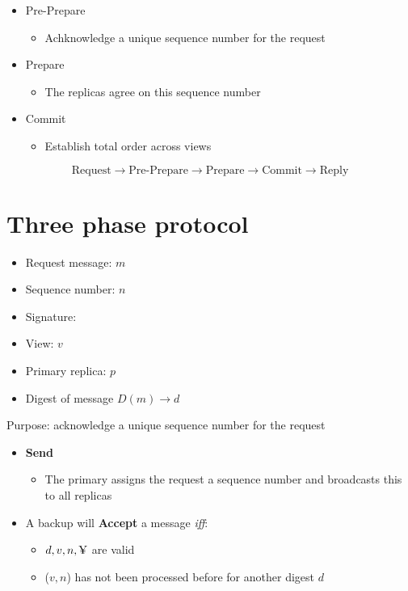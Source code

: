 \documentclass{easyclass}
\begin{document}
\begin{lem}{}
    \begin{itemize}
        \item Pre-Prepare
        \begin{itemize}
            \item Achknowledge a unique sequence number for the request
        \end{itemize}
        \item Prepare
        \begin{itemize}
            \item The replicas agree on this sequence number
        \end{itemize}
        \item Commit
        \begin{itemize}
            \item Establish total order across views
        \end{itemize}
    \end{itemize}
    \[\text{Request} \rightarrow \text{Pre-Prepare} \rightarrow \text{Prepare} \rightarrow \text{Commit} \rightarrow \text{Reply}\]
\end{lem}
\section{Three phase protocol}
\begin{theo}[Definitions]{}
    \begin{itemize}
        \item Request message: $m$
        \item Sequence number: $n$
        \item Signature: \textyen
        \item View: $v$
        \item Primary replica: $p$
        \item Digest of message $D(m) \rightarrow d$
    \end{itemize}
\end{theo}

\begin{prf}{}
    Purpose: acknowledge a unique sequence number for the request
    \begin{itemize}
        \item \textbf{Send} 
        \begin{itemize}
            \item The primary assigns the request a sequence number and broadcasts
            this to all replicas
        \end{itemize}
        \item A backup will \textbf{Accept} a message \emph{iff}:
        \begin{itemize}
            \item $d,v,n, \text{\textyen}$ are valid
            \item ($v,n$) has not been processed before for another digest $d$
        \end{itemize}
    \end{itemize}
\end{prf}
\end{document}
